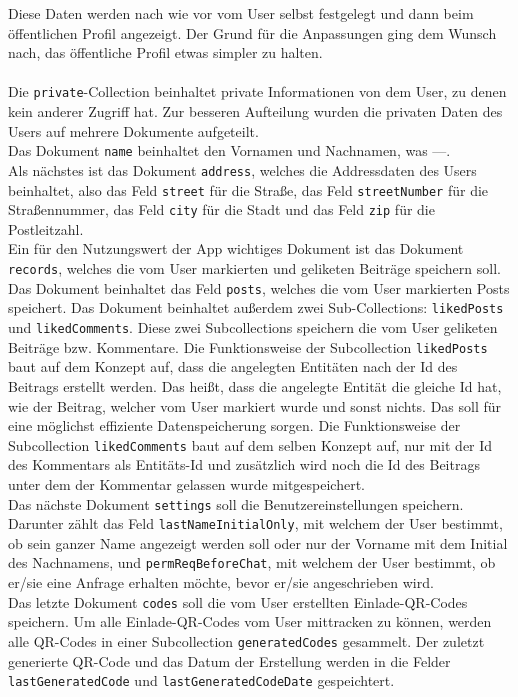Diese Daten werden nach wie vor vom User selbst festgelegt und dann beim öffentlichen Profil angezeigt. Der Grund für die Anpassungen ging dem Wunsch nach, das öffentliche Profil etwas simpler zu halten.
\\\\
Die \texttt{private}-Collection beinhaltet private Informationen von dem User, zu denen kein anderer Zugriff hat. Zur besseren Aufteilung wurden die privaten Daten des Users auf mehrere Dokumente aufgeteilt.
\\
Das Dokument \texttt{name} beinhaltet den Vornamen und Nachnamen, was ---.
\\
Als nächstes ist das Dokument \texttt{address}, welches die Addressdaten des Users beinhaltet, also das Feld \texttt{street} für die Straße, das Feld \texttt{streetNumber} für die Straßennummer, das Feld \texttt{city} für die Stadt und das Feld \texttt{zip} für die Postleitzahl.
\\
Ein für den Nutzungswert der App wichtiges Dokument ist das Dokument \texttt{records}, welches die vom User markierten und geliketen Beiträge speichern soll. Das Dokument beinhaltet das Feld \texttt{posts}, welches die vom User markierten Posts speichert. Das Dokument beinhaltet außerdem zwei Sub-Collections: \texttt{likedPosts} und \texttt{likedComments}. Diese zwei Subcollections speichern die vom User geliketen Beiträge bzw. Kommentare. Die Funktionsweise der Subcollection \texttt{likedPosts} baut auf dem Konzept auf, dass die angelegten Entitäten nach der Id des Beitrags erstellt werden. Das heißt, dass die angelegte Entität die gleiche Id hat, wie der Beitrag, welcher vom User markiert wurde und sonst nichts. Das soll für eine möglichst effiziente Datenspeicherung sorgen. Die Funktionsweise der Subcollection \texttt{likedComments} baut auf dem selben Konzept auf, nur mit der Id des Kommentars als Entitäts-Id und zusätzlich wird noch die Id des Beitrags unter dem der Kommentar gelassen wurde mitgespeichert.
\\
Das nächste Dokument \texttt{settings} soll die Benutzereinstellungen speichern. Darunter zählt das Feld \texttt{lastNameInitialOnly}, mit welchem der User bestimmt, ob sein ganzer Name angezeigt werden soll oder nur der Vorname mit dem Initial des Nachnamens, und \texttt{permReqBeforeChat}, mit welchem der User bestimmt, ob er/sie eine Anfrage erhalten möchte, bevor er/sie angeschrieben wird.
\\
Das letzte Dokument \texttt{codes} soll die vom User erstellten Einlade-QR-Codes speichern. Um alle Einlade-QR-Codes vom User mittracken zu können, werden alle QR-Codes in einer Subcollection \texttt{generatedCodes} gesammelt. Der zuletzt generierte QR-Code und das Datum der Erstellung werden in die Felder \texttt{lastGeneratedCode} und \texttt{lastGeneratedCodeDate} gespeichtert.

